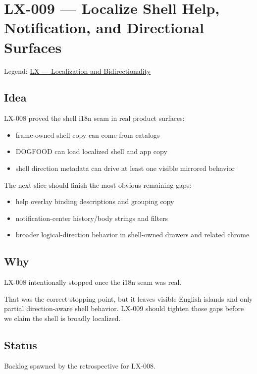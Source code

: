 \chapter{LX-009 --- Localize Shell Help, Notification, and Directional Surfaces}\label{record-356}

\smallskip

Legend: \href{https://github.com/flyingrobots/bijou/blob/cbd70612140e7a450d764b3c7be1c6af878b99bc/docs/method/graveyard/legends/LX-localization-and-bidirectionality.md}{LX --- Localization and Bidirectionality}

\section{Idea}\label{record-356-idea}

LX-008 proved the shell i18n seam in real product surfaces:

\begin{itemize}
\tightlist
\item
  frame-owned shell copy can come from catalogs
\item
  DOGFOOD can load localized shell and app copy
\item
  shell direction metadata can drive at least one visible mirrored behavior
\end{itemize}

The next slice should finish the most obvious remaining gaps:

\begin{itemize}
\tightlist
\item
  help overlay binding descriptions and grouping copy
\item
  notification-center history/body strings and filters
\item
  broader logical-direction behavior in shell-owned drawers and related chrome
\end{itemize}

\section{Why}\label{record-356-why}

LX-008 intentionally stopped once the i18n seam was real.

That was the correct stopping point, but it leaves visible English islands and only partial direction-aware shell behavior. LX-009 should tighten those gaps before we claim the shell is broadly localized.

\section{Status}\label{record-356-status}

Backlog spawned by the retrospective for LX-008.

